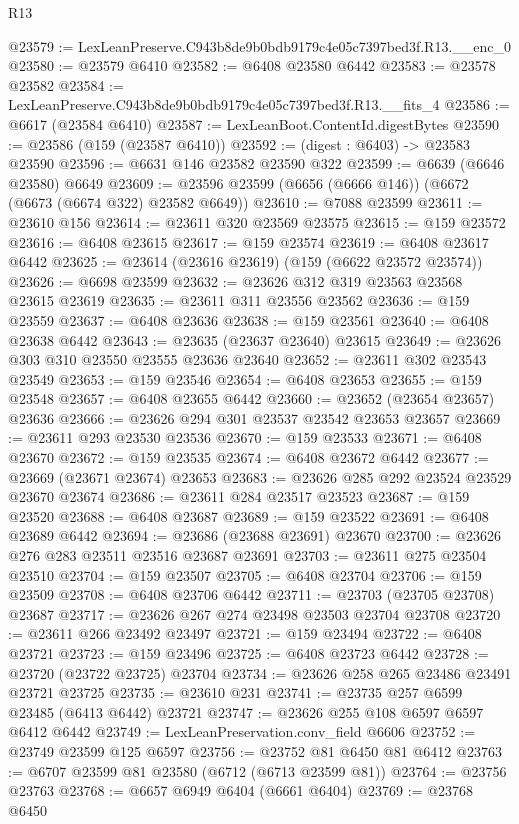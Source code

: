\begin{lexlean}{R13}
\begin{coremodule}
@23579 := LexLeanPreserve.C943b8de9b0bdb9179c4e05c7397bed3f.R13.__enc_0
@23580 := @23579 @6410
@23582 := @6408 @23580 @6442
@23583 := @23578 @23582
@23584 := LexLeanPreserve.C943b8de9b0bdb9179c4e05c7397bed3f.R13.__fits_4
@23586 := @6617 (@23584 @6410)
@23587 := LexLeanBoot.ContentId.digestBytes
@23590 := @23586 (@159 (@23587 @6410))
@23592 := (digest : @6403) -> @23583 @23590
@23596 := @6631 @146 @23582 @23590 @322
@23599 := @6639 (@6646 @23580) @6649
@23609 := @23596 @23599 (@6656 (@6666 @146)) (@6672 (@6673 (@6674 @322) @23582 @6649))
@23610 := @7088 @23599
@23611 := @23610 @156
@23614 := @23611 @320 @23569 @23575
@23615 := @159 @23572
@23616 := @6408 @23615
@23617 := @159 @23574
@23619 := @6408 @23617 @6442
@23625 := @23614 (@23616 @23619) (@159 (@6622 @23572 @23574))
@23626 := @6698 @23599
@23632 := @23626 @312 @319 @23563 @23568 @23615 @23619
@23635 := @23611 @311 @23556 @23562
@23636 := @159 @23559
@23637 := @6408 @23636
@23638 := @159 @23561
@23640 := @6408 @23638 @6442
@23643 := @23635 (@23637 @23640) @23615
@23649 := @23626 @303 @310 @23550 @23555 @23636 @23640
@23652 := @23611 @302 @23543 @23549
@23653 := @159 @23546
@23654 := @6408 @23653
@23655 := @159 @23548
@23657 := @6408 @23655 @6442
@23660 := @23652 (@23654 @23657) @23636
@23666 := @23626 @294 @301 @23537 @23542 @23653 @23657
@23669 := @23611 @293 @23530 @23536
@23670 := @159 @23533
@23671 := @6408 @23670
@23672 := @159 @23535
@23674 := @6408 @23672 @6442
@23677 := @23669 (@23671 @23674) @23653
@23683 := @23626 @285 @292 @23524 @23529 @23670 @23674
@23686 := @23611 @284 @23517 @23523
@23687 := @159 @23520
@23688 := @6408 @23687
@23689 := @159 @23522
@23691 := @6408 @23689 @6442
@23694 := @23686 (@23688 @23691) @23670
@23700 := @23626 @276 @283 @23511 @23516 @23687 @23691
@23703 := @23611 @275 @23504 @23510
@23704 := @159 @23507
@23705 := @6408 @23704
@23706 := @159 @23509
@23708 := @6408 @23706 @6442
@23711 := @23703 (@23705 @23708) @23687
@23717 := @23626 @267 @274 @23498 @23503 @23704 @23708
@23720 := @23611 @266 @23492 @23497
@23721 := @159 @23494
@23722 := @6408 @23721
@23723 := @159 @23496
@23725 := @6408 @23723 @6442
@23728 := @23720 (@23722 @23725) @23704
@23734 := @23626 @258 @265 @23486 @23491 @23721 @23725
@23735 := @23610 @231
@23741 := @23735 @257 @6599 @23485 (@6413 @6442) @23721
@23747 := @23626 @255 @108 @6597 @6597 @6412 @6442
@23749 := LexLeanPreservation.conv_field @6606
@23752 := @23749 @23599 @125 @6597
@23756 := @23752 @81 @6450 @81 @6412
@23763 := @6707 @23599 @81 @23580 (@6712 (@6713 @23599 @81))
@23764 := @23756 @23763
@23768 := @6657 @6949 @6404 (@6661 @6404)
@23769 := @23768 @6450

\end{coremodule}
\end{lexlean}
